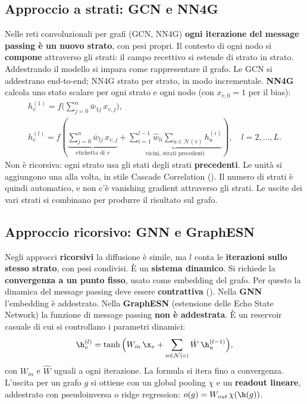 \subsection{Approccio a strati: GCN e NN4G}

Nelle reti convoluzionali per grafi (GCN, NN4G) \textbf{ogni iterazione del message passing è un nuovo strato}, con
pesi propri. Il contesto di ogni nodo si \textbf{compone} attraverso gli strati: il campo recettivo si estende di
strato in strato. Addestrando il modello si impara come rappresentare il grafo. Le GCN si addestrano end-to-end; NN4G
strato per strato, in modo incrementale. \textbf{NN4G} calcola uno stato scalare per ogni strato e ogni nodo (con
$x_{v,0}=1$ per il bias):
\[
\begin{gathered}
h_v^{(1)} = f\Big(\sum_{j=0}^{n}\bar w_{1j}\,x_{v,j}\Big),\\
h_v^{(l)} = f\left(\underbrace{\sum_{j=0}^{n}\bar w_{lj}\,x_{v,j}}_{\text{etichetta di }v} +
\underbrace{\sum_{i=1}^{l-1}\hat w_{li}\sum_{u\in\mathcal N(v)}h_u^{(i)}}_{\text{vicini, strati precedenti}}\right),\quad l = 2,\dots,L.
\end{gathered}
\]
Non è ricorsiva: ogni strato usa gli stati degli strati \textbf{precedenti}. Le unità si aggiungono una alla volta,
in stile Cascade Correlation (). Il numero di strati è quindi automatico, e non c'è
vanishing gradient attraverso gli strati. Le uscite dei vari strati si combinano per produrre il risultato sul
grafo.

\subsection{Approccio ricorsivo: GNN e GraphESN}

Negli approcci \textbf{ricorsivi} la diffusione è simile, ma $l$ conta le \textbf{iterazioni sullo stesso strato},
con pesi condivisi. È un \textbf{sistema dinamico}. Si richiede la \textbf{convergenza a un punto fisso}, usato come
embedding del grafo. Per questo la dinamica del message passing deve essere \textbf{contrattiva} ().
Nella \textbf{GNN} l'embedding è addestrato. Nella \textbf{GraphESN} (estensione delle Echo State Network) la funzione
di message passing \textbf{non è addestrata}. È un reservoir casuale di cui si controllano i parametri dinamici:
\[
\h_v^{(l)} = \tanh\Big(W_{\mathit{in}}\,\x_v + \sum_{u\in\mathcal N(v)}\hat W\,\h_u^{(l-1)}\Big),
\]
con $W_{\mathit{in}}$ e $\hat W$ uguali a ogni iterazione. La formula si itera fino a convergenza. L'uscita per un
grafo $g$ si ottiene con un global pooling $\chi$ e un \textbf{readout lineare}, addestrato con pseudoinversa o
ridge regression: $o(g) = W_{\mathit{out}}\,\chi(\h(g))$.

